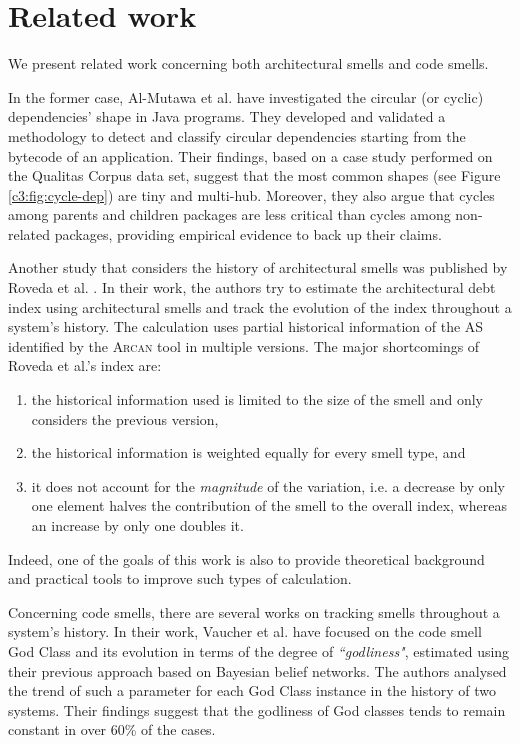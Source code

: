 \section{Related work}\label{c3:sec:related-work}
We present related work concerning both architectural smells and code smells.

In the former case, Al-Mutawa et al. \cite{AlMutawa2014} have investigated the circular (or cyclic) dependencies' shape in Java programs. 
They developed and validated a methodology to detect and classify circular dependencies starting from the bytecode of an application.
Their findings, based on a case study performed on the Qualitas Corpus \cite{QualitasCorpus2010} data set, suggest that the most common shapes (see Figure \ref{c3:fig:cycle-dep}) are tiny and multi-hub. Moreover, they also argue that cycles among parents and children packages are less critical than cycles among non-related packages, providing empirical evidence to back up their claims.

Another study that considers the history of architectural smells was published by Roveda et al. \cite{Roveda2018}.
In their work, the authors try to estimate the architectural debt index using architectural smells and track the evolution of the index throughout a system's history.
The calculation uses partial historical information of the AS identified by the \textsc{Arcan} tool in multiple versions.
The major shortcomings of Roveda et al.'s index are:
\begin{enumerate}[label=(\roman*)]
    \item the historical information used is limited to the size of the smell and only considers the previous version,
    \item the historical information is weighted equally for every smell type, and
    \item it does not account for the \emph{magnitude} of the variation, i.e. a decrease by only one element halves the contribution of the smell to the overall index, whereas an increase by only one doubles it.
\end{enumerate}
Indeed, one of the goals of this work is also to provide theoretical background and practical tools to improve such types of calculation.

Concerning code smells, there are several works on tracking smells throughout a system's history.
In their work, Vaucher et al. \cite{Vaucher2009} have focused on the code smell God Class and its evolution in terms of the degree of \textit{``godliness"}, estimated using their previous approach based on Bayesian belief networks.
The authors analysed the trend of such a parameter for each God Class instance in the history of two systems. Their findings suggest that the godliness of God classes tends to remain constant in over 60\% of the cases.

